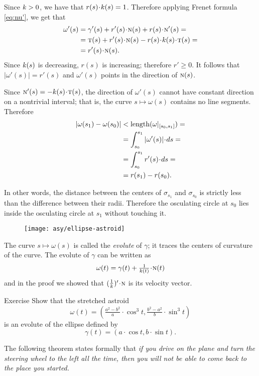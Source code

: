 Since $k>0$, we have that $r(s)\cdot\skur(s)=1$.
Therefore applying Frenet formula \ref{eq:nu'}, we get that
\begin{align*}
\omega'(s)&=\gamma'(s)+r'(s)\cdot \norm(s)+r(s)\cdot \norm'(s)=
\\
&=\tan(s)+r'(s)\cdot \norm(s)-r(s)\cdot \skur(s)\cdot \tan(s)=
\\
&=r'(s)\cdot \norm(s).
\end{align*}
Since $k(s)$ is decreasing, $r(s)$ is increasing;
therefore $r'\ge 0$.
It follows that $|\omega'(s)|= r'(s)$ and $\omega'(s)$ points in the direction of $\text{\sc{n}}(s)$.

Since $\norm'(s)=-\skur(s)\cdot\tan(s)$, the direction of $\omega'(s)$ cannot have constant direction on a nontrivial interval;
that is, the curve $s\mapsto \omega(s)$ contains no line segments.
Therefore 
\begin{align*}
|\omega(s_1)-\omega(s_0)|&<\length(\omega|_{[s_0,s_1]})=
\\
&=\int_{s_0}^{s_1}|\omega'(s)|\cdot ds=
\\
&=\int_{s_0}^{s_1}r'(s)\cdot ds=
\\
&=r(s_1)-r(s_0).
\end{align*}

In other words, the distance between the centers of $\sigma_{s_1}$ and $\sigma_{s_0}$
is strictly less than the difference between their radii.
Therefore the osculating circle at $s_0$ lies inside the osculating circle at $s_1$ without touching it.
\qeds

{

\begin{wrapfigure}{r}{32 mm}
\vskip-4mm
\centering
\texttt{[image: asy/ellipse-astroid]}
\vskip-0mm
\end{wrapfigure}

The curve $s\mapsto \omega(s)$ is called the \emph{evolute} of $\gamma$; 
it traces the centers of curvature of the curve. 
The evolute of $\gamma$ can be written as 
\[\omega(t)=\gamma(t)+\tfrac1{\skur(t)}\cdot \norm(t)\] and  
in the proof we showed that $(\tfrac1{\skur})'\cdot\norm$ is its velocity vector.


\begin{thm}{Exercise}\label{ex:evolute-of-ellipse}
Show that the stretched astroid 
\[\omega(t)=(\tfrac{a^2-b^2}{a}\cdot \cos^3 t,  \tfrac{b^2-a^2}{b}\cdot\sin^3 t)\]
is an evolute of the ellipse defined by
\[\gamma(t)= (a\cdot \cos t, b\cdot\sin t).\]
\end{thm}

The following theorem states formally that 
\emph{if you drive on the plane and turn the steering wheel to the left all the time,
then you will not be able to come back to the place you started.}

}

